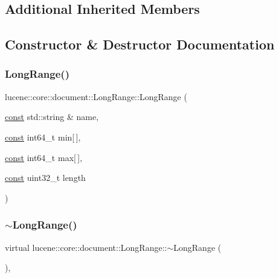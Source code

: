 \subsection*{Additional Inherited Members}


\subsection{Constructor \& Destructor Documentation}
\mbox{\label{classlucene_1_1core_1_1document_1_1LongRange_a7f20f8b15104f6ea7e3cab36310ce777}} 
\subsubsection{\texorpdfstring{Long\+Range()}{LongRange()}}
{\footnotesize\ttfamily lucene\+::core\+::document\+::\+Long\+Range\+::\+Long\+Range (\begin{DoxyParamCaption}\item[{\mbox{\hyperlink{ZlibCrc32_8h_a2c212835823e3c54a8ab6d95c652660e}{const}} std\+::string \&}]{name,  }\item[{\mbox{\hyperlink{ZlibCrc32_8h_a2c212835823e3c54a8ab6d95c652660e}{const}} int64\+\_\+t}]{min\mbox{[}$\,$\mbox{]},  }\item[{\mbox{\hyperlink{ZlibCrc32_8h_a2c212835823e3c54a8ab6d95c652660e}{const}} int64\+\_\+t}]{max\mbox{[}$\,$\mbox{]},  }\item[{\mbox{\hyperlink{ZlibCrc32_8h_a2c212835823e3c54a8ab6d95c652660e}{const}} uint32\+\_\+t}]{length }\end{DoxyParamCaption})\hspace{0.3cm}{\ttfamily [inline]}}

\mbox{\label{classlucene_1_1core_1_1document_1_1LongRange_a43d92b6373148b460ad9266023ab57ec}} 
\subsubsection{\texorpdfstring{$\sim$\+Long\+Range()}{~LongRange()}}
{\footnotesize\ttfamily virtual lucene\+::core\+::document\+::\+Long\+Range\+::$\sim$\+Long\+Range (\begin{DoxyParamCaption}{ }\end{DoxyParamCaption})\hspace{0.3cm}{\ttfamily [inline]}, {\ttfamily [virtual]}}



